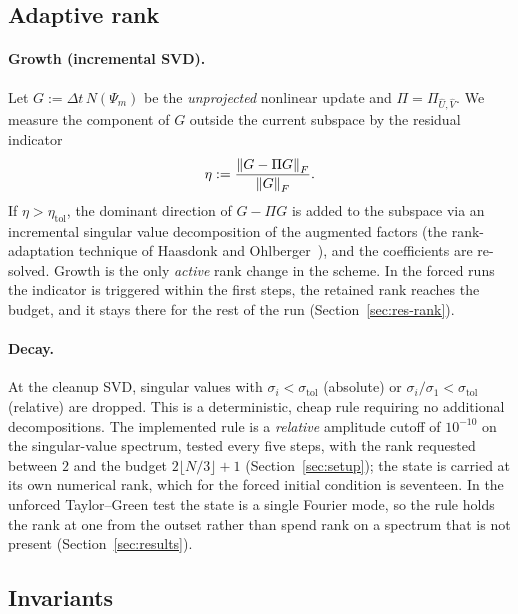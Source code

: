 \subsection{Adaptive rank}
\label{sec:rank-adaptation}

\paragraph{Growth (incremental SVD).}
Let $G := \Delta t\, N(\Psi_m)$ be the \emph{unprojected} nonlinear update and
$\Pi = \Pi_{\hat U, \hat V}$. We measure the component of $G$ outside the
current subspace by the residual indicator
\begin{equation}
  \eta := \frac{\left\lVert G - \Pi G \right\rVert_F}{\left\lVert G \right\rVert_F}.
  \label{eq:indicator}
\end{equation}
If $\eta > \eta_{\mathrm{tol}}$, the dominant direction of $G - \Pi G$ is
added to the subspace via an incremental singular value decomposition of the
augmented factors (the rank-adaptation technique of
Haasdonk and Ohlberger~\cite{haasdonk2012}), and the coefficients are
re-solved. Growth is the only \emph{active} rank change in the scheme. In the
forced runs the indicator is triggered within the first steps, the retained rank
reaches the budget, and it stays there for the rest of the run
(Section~\ref{sec:res-rank}).

\paragraph{Decay.}
At the cleanup SVD, singular values with $\sigma_i < \sigma_{\mathrm{tol}}$
(absolute) or $\sigma_i/\sigma_1 < \sigma_{\mathrm{tol}}$ (relative) are
dropped. This is a deterministic, cheap rule requiring no additional
decompositions. The implemented rule is a \emph{relative} amplitude cutoff of
$10^{-10}$ on the singular-value spectrum, tested every five steps, with the
rank requested between $2$ and the budget $2\lfloor N/3\rfloor+1$
(Section~\ref{sec:setup}); the state is carried at its own numerical rank, which
for the forced initial condition is seventeen. In the unforced Taylor--Green test
the state is a single Fourier mode, so the rule holds the rank at one from the
outset rather than spend rank on a spectrum that is not present
(Section~\ref{sec:results}).

\subsection{Invariants}
\label{sec:invariants}

